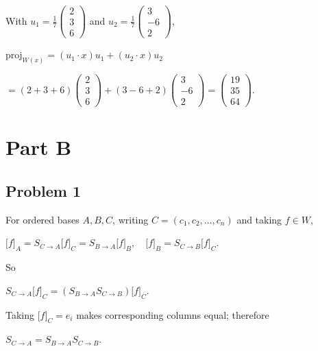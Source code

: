 With \(u_{1} = \frac{1}{7}\begin{pmatrix}
2 \\
3 \\
6
\end{pmatrix}\) and \(u_{2} = \frac{1}{7}\begin{pmatrix}
3 \\
{- 6} \\
2
\end{pmatrix}\),

\(\text{proj}_{W{(x)}} = \left( {u_{1} \cdot x} \right)u_{1} + \left( {u_{2} \cdot x} \right)u_{2}\)

\(= \left( {2 + 3 + 6} \right)\begin{pmatrix}
2 \\
3 \\
6
\end{pmatrix} + \left( {3 - 6 + 2} \right)\begin{pmatrix}
3 \\
{- 6} \\
2
\end{pmatrix} = \begin{pmatrix}
19 \\
35 \\
64
\end{pmatrix}.\)

\chapter{Part B}

\section{Problem 1}

For ordered bases \(A,B,C\), writing \(C = \left( {c_{1},c_{2},\ldots,c_{n}} \right)\) and taking \(f \in W\),

\(\lbrack f\rbrack_{A} = S_{C\rightarrow A}\lbrack f\rbrack_{C} = S_{B\rightarrow A}\lbrack f\rbrack_{B},\quad\lbrack f\rbrack_{B} = S_{C\rightarrow B}\lbrack f\rbrack_{C}.\)

So

\(S_{C\rightarrow A}\lbrack f\rbrack_{C} = \left( {S_{B\rightarrow A}S_{C\rightarrow B}} \right)\lbrack f\rbrack_{C}.\)

Taking \(\lbrack f\rbrack_{C} = e_{i}\) makes corresponding columns equal; therefore

\(S_{C\rightarrow A} = S_{B\rightarrow A}S_{C\rightarrow B}.\)

